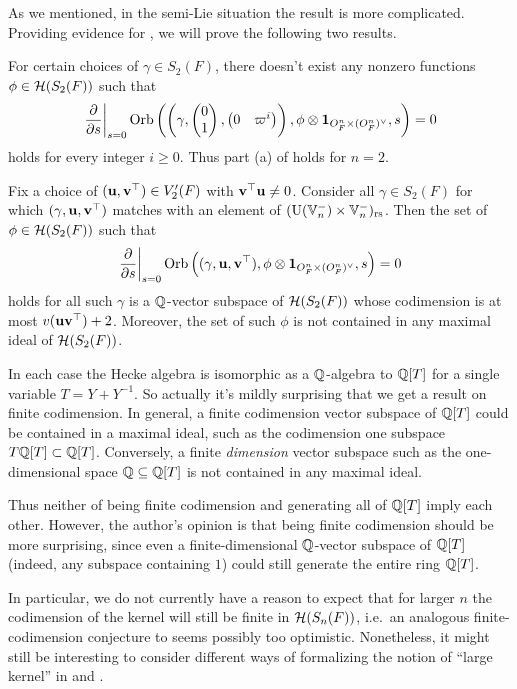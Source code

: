 As we mentioned, in the semi-Lie situation the result is more complicated.
Providing evidence for ,
we will prove the following two results.
\begin{theorem}
  \label{thm:semi_lie_ker_trivial}
  For certain choices of $\gamma \in S_2(F)$,
  there doesn't exist any nonzero functions $\phi \in \mathcal H(S_2(F))$ such that
  \[ \left. \pdv{}{s} \right\rvert_{s=0}
    \operatorname{Orb} \left(
      \left( \gamma, \begin{pmatrix} 0 \\ 1 \end{pmatrix}, \begin{pmatrix} 0 & \varpi^i \end{pmatrix} \right),
      \phi \otimes \mathbf{1}_{O_F^n \times (O_F^n)^\vee}, s
    \right) = 0 \]
  holds for every integer $i \ge 0$.
  Thus part (a) of  holds for $n = 2$.
\end{theorem}

\begin{theorem}
  \label{thm:semi_lie_ker_huge}
  Fix a choice of $(\mathbf u, \mathbf v^\top) \in V_2'(F)$ with $\mathbf v^\top \mathbf u \neq 0$.
  Consider all $\gamma \in S_2(F)$ for which ${(\gamma, \mathbf u, \mathbf v^\top)}$
  matches with an element of $(\operatorname{U}(\mathbb V_n^-) \times \mathbb V_n^-)_{\mathrm{rs}}$.
  Then the set of $\phi \in \mathcal H(S_2(F))$ such that
  \[
    \left. \pdv{}{s} \right\rvert_{s=0}
    \operatorname{Orb} \left( {(\gamma, \mathbf u, \mathbf v^\top)}, \phi \otimes \mathbf{1}_{O_F^n \times (O_F^n)^\vee}, s \right) = 0
  \]
  holds for all such $\gamma$ is a $\mathbb Q$-vector subspace of $\mathcal H(S_2(F))$
  whose codimension is at most $v(\mathbf u \mathbf v^\top) + 2$.
  Moreover, the set of such $\phi$ is not contained in any maximal ideal of $\mathcal H(S_2(F))$.
\end{theorem}

\begin{remark}
  In each case the Hecke algebra is isomorphic as a $\mathbb Q$-algebra to $\mathbb Q[T]$
  for a single variable $T = Y+Y^{-1}$.
  So actually it's mildly surprising that we get a result on finite codimension.
  In general, a finite codimension vector subspace of $\mathbb Q[T]$ could
  be contained in a maximal ideal,
  such as the codimension one subspace $T \mathbb Q[T] \subset \mathbb Q[T]$.
  Conversely, a finite \emph{dimension} vector subspace such as
  the one-dimensional space $\mathbb Q \subseteq \mathbb Q[T]$ is not contained in any maximal ideal.

  Thus neither of being finite codimension and generating all of $\mathbb Q[T]$ imply each other.
  However, the author's opinion is that being finite codimension should be more surprising,
  since even a finite-dimensional $\mathbb Q$-vector subspace of $\mathbb Q[T]$
  (indeed, any subspace containing $1$) could still generate the entire ring $\mathbb Q[T]$.

  In particular, we do not currently have a reason to expect that for larger $n$
  the codimension of the kernel will still be finite in $\mathcal H(S_n(F))$,
  i.e.\ an analogous finite-codimension conjecture
  to  seems possibly too optimistic.
  Nonetheless, it might still be interesting to consider different ways
  of formalizing the notion of ``large kernel'' in 
  and .
\end{remark}

